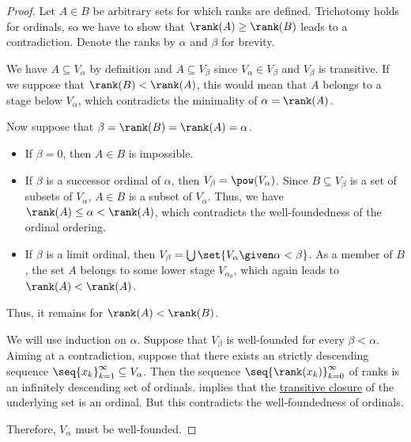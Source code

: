 \begin{proof}
   Let \( A \in B \) be arbitrary sets for which ranks are defined. Trichotomy holds for ordinals, so we have to show that \( \rank(A) \geq \rank(B) \) leads to a contradiction. Denote the ranks by \( \alpha \) and \( \beta \) for brevity.

  We have \( A \subseteq V_\alpha \) by definition and \( A \subseteq V_\beta \) since \( V_\alpha \in V_\beta \) and \( V_\beta \) is transitive. If we suppose that \( \rank(B) < \rank(A) \), this would mean that \( A \) belongs to a stage below \( V_\alpha \), which contradicts the minimality of \( \alpha = \rank(A) \).

  Now suppose that \( \beta = \rank(B) = \rank(A) = \alpha \).
  \begin{itemize}
    \item If \( \beta = 0 \), then \( A \in B \) is impossible.

    \item If \( \beta \) is a successor ordinal of \( \alpha \), then \( V_\beta = \pow(V_\alpha) \). Since \( B \subseteq V_\beta \) is a set of subsets of \( V_\alpha \), \( A \in B \) is a subset of \( V_\alpha \). Thus, we have \( \rank(A) \leq \alpha < \rank(A) \), which contradicts the well-foundedness of the ordinal ordering.

    \item If \( \beta \) is a limit ordinal, then \( V_\beta = \bigcup\set{ V_\alpha \given \alpha < \beta } \). As a member of \( B \), the set \( A \) belongs to some lower stage \( V_{\alpha_0} \), which again leads to \( \rank(A) < \rank(A) \).
  \end{itemize}

  Thus, it remains for \( \rank(A) < \rank(B) \).

   We will use induction on \( \alpha \). Suppose that \( V_\beta \) is well-founded for every \( \beta < \alpha \). Aiming at a contradiction, suppose that there exists an strictly descending sequence \( \seq{ x_k }_{k=1}^\infty \subseteq V_\alpha \). Then the sequence \( \seq{ \rank(x_k) }_{k=0}^\infty \) of ranks is an infinitely descending set of ordinals.  implies that the \hyperref[def:set_transitive_closure]{transitive closure} of the underlying set is an ordinal. But this contradicts the well-foundedness of ordinals.

  Therefore, \( V_\alpha \) must be well-founded.


\end{proof}
